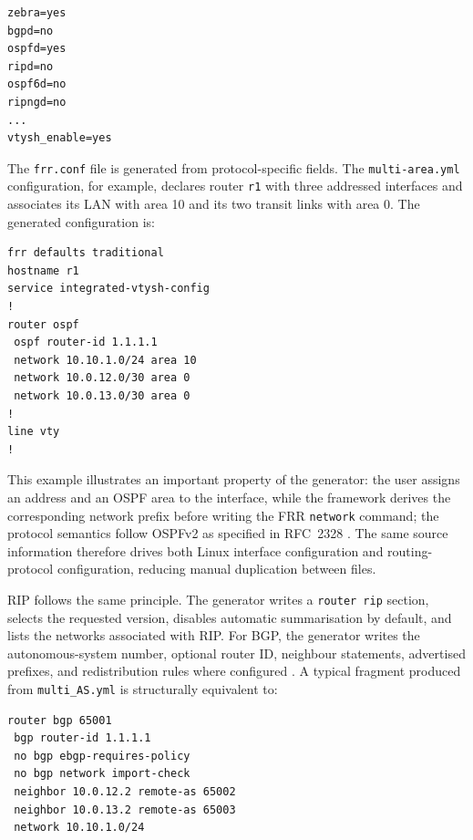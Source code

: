 \begin{lstlisting}[caption={Relevant entries in an automatically generated FRR daemons file.},label={lst:frr-daemons}]
zebra=yes
bgpd=no
ospfd=yes
ripd=no
ospf6d=no
ripngd=no
...
vtysh_enable=yes
\end{lstlisting}

The \texttt{frr.conf} file is generated from protocol-specific fields. The
\texttt{multi-area.yml} configuration, for example, declares router \texttt{r1}
with three addressed interfaces and associates its LAN with area 10 and its two
transit links with area 0. The generated configuration is:

\begin{lstlisting}[caption={FRRouting configuration generated for r1 in the multi-area laboratory.},label={lst:generated-ospf-conf}]
frr defaults traditional
hostname r1
service integrated-vtysh-config
!
router ospf
 ospf router-id 1.1.1.1
 network 10.10.1.0/24 area 10
 network 10.0.12.0/30 area 0
 network 10.0.13.0/30 area 0
!
line vty
!
\end{lstlisting}

This example illustrates an important property of the generator: the user
assigns an address and an OSPF area to the interface, while the framework
derives the corresponding network prefix before writing the FRR
\texttt{network} command; the protocol semantics follow OSPFv2 as specified in
RFC~2328 \cite{rfc2328}. The same source information therefore drives both
Linux interface configuration and routing-protocol configuration, reducing
manual duplication between files.

RIP follows the same principle. The generator writes a \texttt{router rip}
section, selects the requested version, disables automatic summarisation by
default, and lists the networks associated with RIP. For BGP, the generator
writes the autonomous-system number, optional router ID, neighbour statements,
advertised prefixes, and redistribution rules where configured
\cite{rfc4271}. A typical
fragment produced from \texttt{multi\_AS.yml} is structurally equivalent to:

\begin{lstlisting}[caption={Example of automatically generated BGP configuration.},label={lst:generated-bgp-conf}]
router bgp 65001
 bgp router-id 1.1.1.1
 no bgp ebgp-requires-policy
 no bgp network import-check
 neighbor 10.0.12.2 remote-as 65002
 neighbor 10.0.13.2 remote-as 65003
 network 10.10.1.0/24
\end{lstlisting}

